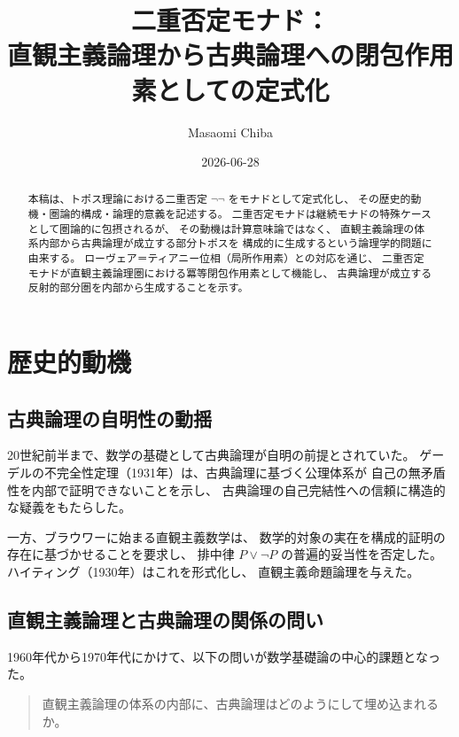 \documentclass[11pt,a4paper]{article}
\theoremstyle{definition}
\begin{document}
\title{二重否定モナド：\\
直観主義論理から古典論理への閉包作用素としての定式化}
\author{Masaomi Chiba}
\date{2026-06-28}
\maketitle

\begin{abstract}
本稿は、トポス理論における二重否定 $\neg\neg$ をモナドとして定式化し、
その歴史的動機・圏論的構成・論理的意義を記述する。
二重否定モナドは継続モナドの特殊ケースとして圏論的に包摂されるが、
その動機は計算意味論ではなく、
直観主義論理の体系内部から古典論理が成立する部分トポスを
構成的に生成するという論理学的問題に由来する。
ローヴェア＝ティアニー位相（局所作用素）との対応を通じ、
二重否定モナドが直観主義論理圏における冪等閉包作用素として機能し、
古典論理が成立する反射的部分圏を内部から生成することを示す。
\end{abstract}

\tableofcontents
\newpage

\section{歴史的動機}

\subsection{古典論理の自明性の動揺}

20世紀前半まで、数学の基礎として古典論理が自明の前提とされていた。
ゲーデルの不完全性定理（1931年）は、古典論理に基づく公理体系が
自己の無矛盾性を内部で証明できないことを示し、
古典論理の自己完結性への信頼に構造的な疑義をもたらした。

一方、ブラウワーに始まる直観主義数学は、
数学的対象の実在を構成的証明の存在に基づかせることを要求し、
排中律 $P \lor \neg P$ の普遍的妥当性を否定した。
ハイティング（1930年）はこれを形式化し、
直観主義命題論理を与えた。

\subsection{直観主義論理と古典論理の関係の問い}

1960年代から1970年代にかけて、以下の問いが数学基礎論の中心的課題となった。

\begin{quote}
直観主義論理の体系の内部に、古典論理はどのようにして埋め込まれるか。
\end{quote}
\end{document}
